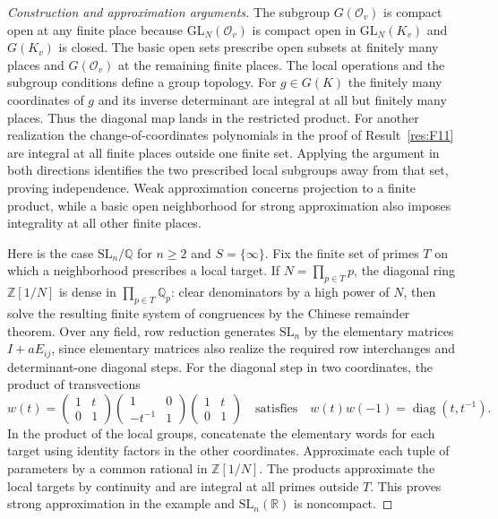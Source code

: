 \documentclass[11pt,a4paper,openany,oneside]{book}
\theoremstyle{resultstyle}
\theoremstyle{definition}
\numberwithin{equation}{chapter}
\newcommand{\GL}{\mathrm{GL}}
\newcommand{\SL}{\mathrm{SL}}
\newcommand{\OO}{\mathcal{O}}
\newcommand{\ZZ}{\mathbb{Z}}
\newcommand{\RR}{\mathbb{R}}
\newcommand{\QQ}{\mathbb{Q}}
\begin{document}
\begin{proof}[Construction and approximation arguments]
The subgroup $G(\OO_v)$ is compact open at any finite place because $\GL_N(\OO_v)$ is compact open in $\GL_N(K_v)$ and $G(K_v)$ is closed. The basic open sets prescribe open subsets at finitely many places and $G(\OO_v)$ at the remaining finite places. The local operations and the subgroup conditions define a group topology. For $g\in G(K)$ the finitely many coordinates of $g$ and its inverse determinant are integral at all but finitely many places. Thus the diagonal map lands in the restricted product. For another realization the change-of-coordinates polynomials in the proof of Result~\ref{res:F11} are integral at all finite places outside one finite set. Applying the argument in both directions identifies the two prescribed local subgroups away from that set, proving independence. Weak approximation concerns projection to a finite product, while a basic open neighborhood for strong approximation also imposes integrality at all other finite places.

Here is the case $\SL_n/\QQ$ for $n\geq2$ and $S=\{\infty\}$. Fix the finite set of primes $T$ on which a neighborhood prescribes a local target. If $N=\prod_{p\in T}p$, the diagonal ring $\ZZ[1/N]$ is dense in $\prod_{p\in T}\QQ_p$: clear denominators by a high power of $N$, then solve the resulting finite system of congruences by the Chinese remainder theorem. Over any field, row reduction generates $\SL_n$ by the elementary matrices $I+aE_{ij}$, since elementary matrices also realize the required row interchanges and determinant-one diagonal steps. For the diagonal step in two coordinates, the product of transvections
\[
 w(t)=
 \begin{pmatrix}1&t\\0&1\end{pmatrix}
 \begin{pmatrix}1&0\\-t^{-1}&1\end{pmatrix}
 \begin{pmatrix}1&t\\0&1\end{pmatrix}
 \quad\text{satisfies}\quad
 w(t)w(-1)=\operatorname{diag}(t,t^{-1}).
\]
In the product of the local groups, concatenate the elementary words for each target using identity factors in the other coordinates. Approximate each tuple of parameters by a common rational in $\ZZ[1/N]$. The products approximate the local targets by continuity and are integral at all primes outside $T$. This proves strong approximation in the example and $\SL_n(\RR)$ is noncompact.


\end{proof}
\end{document}
